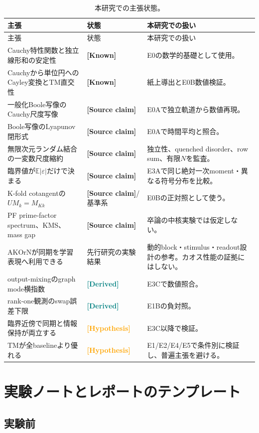 \documentclass[a4paper,11pt,oneside,openany]{ltjsbook}
\newcommand{\E}{\mathbb{E}}
\newcommand{\Known}{\textcolor{Forest}{\sffamily\bfseries [Known]}}
\newcommand{\SourceClaim}{\textcolor{Brick}{\sffamily\bfseries [Source claim]}}
\newcommand{\Derived}{\textcolor{Teal}{\sffamily\bfseries [Derived]}}
\newcommand{\Hypothesis}{\textcolor{Orange}{\sffamily\bfseries [Hypothesis]}}
\begin{document}
\begin{longtable}{p{44mm}p{27mm}p{72mm}}
\caption{本研究での主張状態。}\label{tab:claim_audit}\\
\toprule
主張 & 状態 & 本研究での扱い \\
\midrule
\endfirsthead
\toprule
主張 & 状態 & 本研究での扱い \\
\midrule
\endhead
Cauchy特性関数と独立線形和の安定性 & \Known & E0の数学的基礎として使用。\\
Cauchyから単位円へのCayley変換とTM直交性 & \Known & 紙上導出とE0B数値検証。\\
一般化Boole写像のCauchy尺度写像 & \SourceClaim & E0Aで独立軌道から数値再現。\\
Boole写像のLyapunov閉形式 & \SourceClaim & E0Aで時間平均と照合。\\
無限次元ランダム結合の一変数尺度縮約 & \SourceClaim & 独立性、quenched disorder、row sum、有限\(N\)を監査。\\
臨界値が\(\E|\varepsilon|\)だけで決まる & \SourceClaim & E3Aで同じ絶対一次moment・異なる符号分布を比較。\\
K-fold cotangentの\(UM_k=M_{Kk}\) & \SourceClaim/基準系 & E0Bの正対照として使う。\\
PF prime-factor spectrum、KMS、mass gap & \SourceClaim & 卒論の中核実験では仮定しない。\\
AKOrNが同期を学習表現へ利用できる & 先行研究の実験結果 & 動的block・stimulus・readout設計の参考。カオス性能の証拠にはしない。\\
output-mixingのgraph mode横指数 & \Derived & E3Cで数値照合。\\
rank-one観測のswap誤差下限 & \Derived & E1Bの負対照。\\
臨界近傍で同期と情報保持が両立する & \Hypothesis & E3C以降で検証。\\
TMが全baselineより優れる & \Hypothesis & E1/E2/E4/E5で条件別に検証し、普遍主張を避ける。\\
\bottomrule
\end{longtable}

\chapter{実験ノートとレポートのテンプレート}
\label{app:templates}

\section{実験前}
\end{document}
